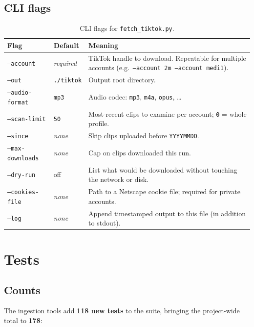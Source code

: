 \documentclass[11pt,a4paper]{report}
\newcommand{\code}[1]{\texttt{\small #1}}
\begin{document}
\subsection{CLI flags}

\begin{table}[ht]
\centering
\small
\renewcommand{\arraystretch}{1.25}
\begin{tabularx}{\textwidth}{@{}l l X@{}}
\toprule
\textbf{Flag} & \textbf{Default} & \textbf{Meaning} \\
\midrule
\code{--account} & \emph{required} & TikTok handle to download. Repeatable for multiple accounts
                                      (e.g.\ \code{--account 2m --account medi1}). \\
\code{--out} & \code{./tiktok} & Output root directory. \\
\code{--audio-format} & \code{mp3} & Audio codec: \code{mp3}, \code{m4a}, \code{opus}, \ldots \\
\code{--scan-limit} & \code{50} & Most-recent clips to examine per account; \code{0} = whole profile. \\
\code{--since} & \emph{none} & Skip clips uploaded before \code{YYYYMMDD}. \\
\code{--max-downloads} & \emph{none} & Cap on clips downloaded this run. \\
\code{--dry-run} & off & List what would be downloaded without touching the network or disk. \\
\code{--cookies-file} & \emph{none} & Path to a Netscape cookie file; required for private accounts. \\
\code{--log} & \emph{none} & Append timestamped output to this file (in addition to stdout). \\
\bottomrule
\end{tabularx}
\caption{CLI flags for \texttt{fetch\_tiktok.py}.}
\label{tab:tt-flags}
\end{table}

\section{Tests}

\subsection{Counts}

The ingestion tools add \textbf{118 new tests} to the suite, bringing the
project-wide total to \textbf{178}:
\end{document}
